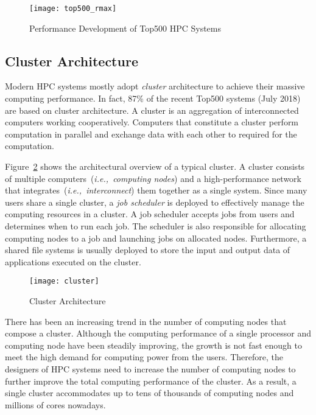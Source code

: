 \begin{figure}
    \centering
    \texttt{[image: top500\_rmax]}
    \caption{Performance Development of Top500 HPC Systems~\autocite{top500}}%
    \label{fig:top500-rmax}
\end{figure}

\subsection{Cluster Architecture}

Modern HPC systems mostly adopt \emph{cluster} architecture to achieve their
massive computing performance. In fact, 87\% of the recent Top500 systems
(July 2018) are based on cluster architecture. A cluster is an aggregation of
interconnected computers working cooperatively. Computers that constitute a
cluster perform computation in parallel and exchange data with each other to
required for the computation.

Figure~\ref{fig:cluster} shows the architectural overview of a typical
cluster. A cluster consists of multiple computers~(\emph{i.e.,\ computing
nodes}) and a high-performance network that integrates~(\emph{i.e.,\
interconnect}) them together as a single system. Since many users share a
single cluster, a \emph{job scheduler} is deployed to effectively manage the
computing resources in a cluster. A job scheduler accepts jobs from users and
determines when to run each job. The scheduler is also responsible for
allocating computing nodes to a job and launching jobs on allocated nodes.
Furthermore, a shared file systems is usually deployed to store the input and
output data of applications executed on the cluster.

\begin{figure}
    \centering
    \texttt{[image: cluster]}
    \caption{Cluster Architecture}%
    \label{fig:cluster}
\end{figure}

There has been an increasing trend in the number of computing nodes that
compose a cluster. Although the computing performance of a single processor
and computing node have been steadily improving, the growth is not fast enough
to meet the high demand for computing power from the users. Therefore, the
designers of HPC systems need to increase the number of computing nodes to
further improve the total computing performance of the cluster. As a result, a
single cluster accommodates up to tens of thousands of computing nodes and
millions of cores nowadays.

